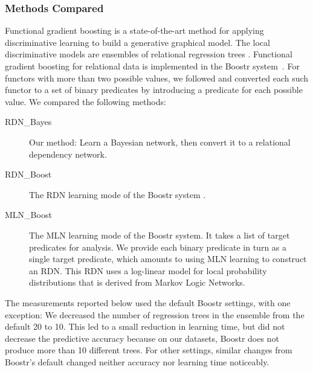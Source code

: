 \documentclass[runningheads,a4paper]{llncs}
\begin{document}
\subsubsection{Methods Compared} \label{sec:methods} Functional gradient boosting is a state-of-the-art method for applying discriminative learning to build a generative graphical model. The local discriminative models are  ensembles of relational regression trees \cite{Khot2011}. Functional gradient boosting for relational data is implemented in the Boostr system~\cite{Khot2013}.
 For functors with more than two possible values, we followed \cite{Khot2011} and converted each such functor to a set of binary predicates by introducing a predicate for each possible value.
%
We compared the following methods:
\begin{description}
\item[RDN\_Bayes] Our method: Learn a Bayesian network, then convert it to a relational dependency network. 
\item[RDN\_Boost] The RDN learning mode of the Boostr system \cite{Natarajan2012}. 
\item[MLN\_Boost] The MLN learning mode of the Boostr system. It takes a  list of target predicates for analysis. We provide each binary predicate in turn as a single target predicate, which amounts to using MLN learning to construct an RDN. This RDN uses a log-linear model for local probability distributions that is derived from Markov Logic Networks.
\end{description}
The measurements reported below used the default Boostr settings, with one exception: We decreased the number of regression trees in the ensemble from the default 20 to 10. This led to a small reduction in learning time, but did not decrease the predictive accuracy because on our datasets, Boostr does not produce more than 10 different trees. For other settings, similar changes from Boostr's default changed neither accuracy nor learning time noticeably.
\end{document}
